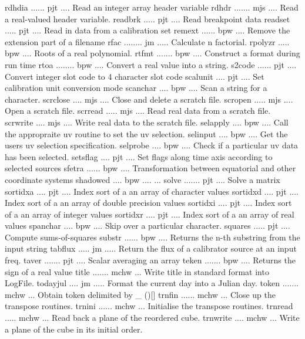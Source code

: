 {\eightpoint\begintt
rdhdia ...... pjt .... Read an integer array header variable 
rdhdr ....... mjs .... Read a real-valued header variable. 
readbrk ..... pjt .... Read breakpoint data 
readset ..... pjt .... Read in data from a calibration set 
remext ...... bpw .... Remove the extension part of a filename 
\endtt}
{\eightpoint\begintt
rfac ........ jm ..... Calculate n factorial. 
rpolyzr ..... bpw .... Roots of a real polynomial. 
rtfmt ....... bpw .... Construct a format during run time 
rtoa ........ bpw .... Convert a real value into a string. 
s2code ...... pjt .... Convert integer slot code to 4 character slot code 
\endtt}
{\eightpoint\begintt
scalunit .... pjt .... Set calibration unit conversion mode 
scanchar .... bpw .... Scan a string for a character. 
scrclose .... mjs .... Close and delete a scratch file. 
scropen ..... mjs .... Open a scratch file. 
scrread ..... mjs .... Read real data from a scratch file. 
\endtt}
{\eightpoint\begintt
scrwrite .... mjs .... Write real data to the scratch file. 
selapply .... bpw .... Call the appropraite uv routine to set the uv selection. 
selinput .... bpw .... Get the users uv selection specification. 
selprobe .... bpw .... Check if a particular uv data has been selected. 
setsflag .... pjt .... Set flags along time axis according to selected sources 
\endtt}
{\eightpoint\begintt
sfetra ...... bpw .... Transformation between equatorial and other coordinate systems 
shadowed .... bpw .... ... 
solve ....... pjt .... Solve a matrix 
sortidxa .... pjt .... Index sort of a an array of character values 
sortidxd .... pjt .... Index sort of a an array of double precision values 
\endtt}
{\eightpoint\begintt
sortidxi .... pjt .... Index sort of a an array of integer values 
sortidxr .... pjt .... Index sort of a an array of real values 
spanchar .... bpw .... Skip over a particular character. 
squares ..... pjt .... Compute sums-of-squares 
substr ...... bpw .... Returns the n-th substring from the input string 
\endtt}
{\eightpoint\begintt
tabflux ..... jm ..... Return the flux of a calibrator source at an input freq. 
taver ....... pjt .... Scalar averaging an array 
teken ....... bpw .... Returns the sign of a real value 
title ....... mchw ... Write title in standard format into LogFile. 
todayjul .... jm ..... Format the current day into a Julian day. 
\endtt}
{\eightpoint\begintt
token ....... mchw ... Obtain token delimited by _ ()[] 
trnfin ...... mchw ... Close up the transpose routines. 
trnini ...... mchw ... Initialise the transpose routines. 
trnread ..... mchw ... Read back a plane of the reordered cube. 
trnwrite .... mchw ... Write a plane of the cube in its initial order. 
\endtt}
